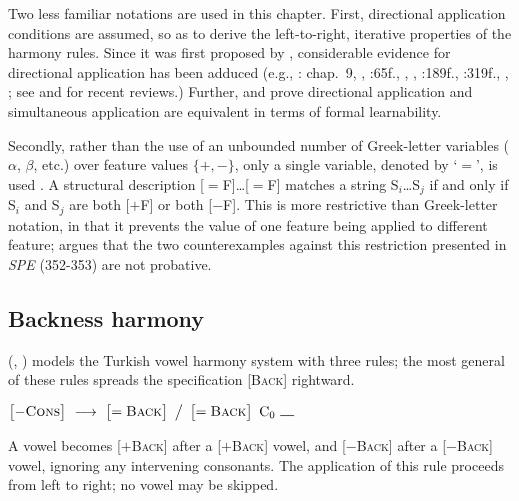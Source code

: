 Two less familiar notations are used in this chapter. First, directional application conditions are assumed, so as to derive the left-to-right, iterative properties of the harmony rules. Since it was first proposed by \citet{Johnson1972}, considerable evidence for directional application has been adduced (e.g., \citealt{A74}: chap.~9, \citealt{GormanInPressc}, \citealt{Howard1972}:65f., \citealt{Kavitskaya2008}, \citealt{Kaye1982}, \citealt{KK77}:189f., \citeyear{KK79}:319f., \citealt{Piggott1975}, \citealt{Sohn1971}; see \citealt{McCarthy2003b} and \citealt{Wolf2011b} for recent reviews.) Further, \citet{Johnson1972} and \citet{Kaplan1994} prove directional application and simultaneous application are equivalent in terms of formal learnability.

Secondly, rather than the use of an unbounded number of Greek-letter variables ($\alpha$, $\beta$, etc.) over feature values $\{+, -\}$, only a single variable, denoted by `$=$', is used \citep{McCawley1973}. A structural description [$=$F]\ldots{}[$=$F] matches a string S$_i$\ldots{}S$_j$ if and only if S$_i$ and S$_j$ are both [$+$F] or both [$-$F]. This is more restrictive than Greek-letter notation, in that it prevents the value of one feature being applied to different feature; \citet{Odden2012} argues that the two counterexamples against this restriction presented in \emph{SPE} (352-353) are not probative.

\subsection{Backness harmony}
\label{ss:bh}

\citeauthor{Lees1966b} (\citeyear[35]{Lees1966b}, \citeyear[284]{Lees1966a}) models the Turkish vowel harmony system with three rules; the most general of these rules spreads the specification [\textsc{Back}] rightward.

\begin{example}
$\begin{bmatrix} -\textsc{Cons} \end{bmatrix}~\goesto~\begin{bmatrix} =\textsc{Back} \end{bmatrix}~\big /~\begin{bmatrix} =\textsc{Back} \end{bmatrix}~\textrm{C}_0~\gap$
\end{example}

\noindent
A vowel becomes [$+$\textsc{Back}] after a [$+$\textsc{Back}] vowel, and [$-$\textsc{Back}] after a [$-$\textsc{Back}] vowel, ignoring any intervening consonants. The application of this rule proceeds from left to right; no vowel may be skipped.

